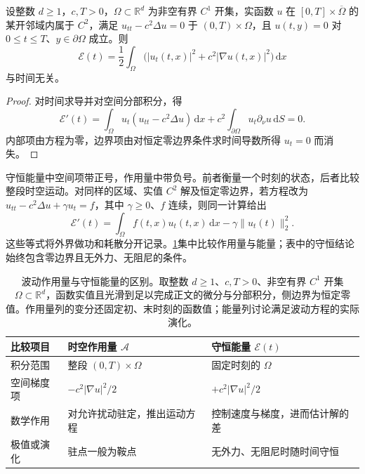 \begin{proposition}[波动能量守恒]
\label{b2:prop:14-wave-energy}
设整数 \(d\geq1\)，\(c,T>0\)，\(\Omega\subset\mathbb R^d\) 为非空有界 \(C^1\) 开集，实函数 \(u\) 在 \([0,T]\times\overline\Omega\) 的某开邻域内属于 \(C^2\)，满足 \(u_{tt}-c^2\Delta u=0\) 于 \((0,T)\times\Omega\)，且 \(u(t,y)=0\) 对 \(0\leq t\leq T\)、\(y\in\partial\Omega\) 成立。则
\[
 \mathcal E(t)=\frac12\int_\Omega
          \bigl(|u_t(t,x)|^2+c^2|\nabla u(t,x)|^2\bigr)\,\mathrm dx
\]
与时间无关。
\end{proposition}
\begin{proof}
对时间求导并对空间分部积分，得
\[
 \mathcal E'(t)=\int_\Omega u_t(u_{tt}-c^2\Delta u)\,\mathrm dx
           +c^2\int_{\partial\Omega}u_t\partial_\nu u\,\mathrm dS=0.
\]
内部项由方程为零，边界项由对恒定零边界条件求时间导数所得 \(u_t=0\) 而消失。
\end{proof}

守恒能量中空间项带正号，作用量中带负号。前者衡量一个时刻的状态，后者比较整段时空运动。对同样的区域、实值 \(C^2\) 解及恒定零边界，若方程改为 \(u_{tt}-c^2\Delta u+\gamma u_t=f\)，其中 \(\gamma\geq0\)、\(f\) 连续，则同一计算给出
\[
 \mathcal E'(t)=\int_\Omega f(t,x)u_t(t,x)\,\mathrm{d}x
                    -\gamma\|u_t(t)\|_2^2.
\]
这些等式将外界做功和耗散分开记录。\cref{b2:tab:14-action-energy}集中比较作用量与能量；表中的守恒结论始终包含零边界且无外力、无阻尼的条件。

\begin{table}[htbp]
\centering
\caption[波动作用量与守恒能量的区别]{波动作用量与守恒能量的区别。取整数 \(d\geq1\)、\(c,T>0\)、非空有界 \(C^1\) 开集 \(\Omega\subset\mathbb R^d\)，函数实值且光滑到足以完成正文的微分与分部积分，侧边界为恒定零值。作用量列的变分还固定初、末时刻的函数值；能量列讨论满足波动方程的实际演化。}
\label{b2:tab:14-action-energy}
\small
\begin{tabularx}{\textwidth}{@{}p{5.2em}XX@{}}
\toprule
比较项目 & 时空作用量 \(\mathcal A\) & 守恒能量 \(\mathcal E(t)\)\\
\midrule
积分范围 & 整段 \((0,T)\times\Omega\) & 固定时刻的 \(\Omega\)\\
空间梯度项 & \(-c^2|\nabla u|^2/2\) & \(+c^2|\nabla u|^2/2\)\\
数学作用 & 对允许扰动驻定，推出运动方程 & 控制速度与梯度，进而估计解的差\\
极值或演化 & 驻点一般为鞍点 & 无外力、无阻尼时随时间守恒\\
\bottomrule
\end{tabularx}
\end{table}

